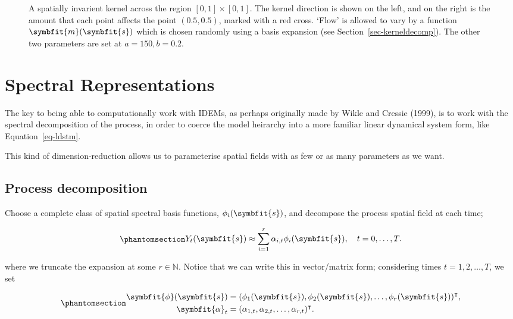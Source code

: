 \documentclass[
]{report}
\newcommand{\bv}[1]{\symbfit{#1}}
\theoremstyle{plain}
\theoremstyle{plain}
\theoremstyle{plain}
\theoremstyle{remark}
\begin{document}
\begin{figure}[h]
\begin{minipage}{0.50\linewidth}
\end{minipage}%

\caption{\label{fig-examplekernelvar}A spatially invarient kernel across
the region \([0,1]\times[0,1]\). The kernel direction is shown on the
left, and on the right is the amount that each point affects the point
\((0.5,0.5)\), marked with a red cross. `Flow' is allowed to vary by a
function \(\bv m(\bv s)\) which is chosen randomly using a basis
expansion (see Section~\ref{sec-kerneldecomp}). The other two parameters
are set at \(a=150,b=0.2\).}

\end{figure}%

\chapter{Spectral Representations}\label{spectral-representations}

The key to being able to computationally work with IDEMs, as perhaps
originally made by Wikle and Cressie (1999), is to work with the
spectral decomposition of the process, in order to coerce the model
heirarchy into a more familiar linear dynamical system form, like
Equation~\ref{eq-ldstm}.

This kind of dimension-reduction allows us to parameterise spatial
fields with as few or as many parameters as we want.

\section{Process decomposition}\label{process-decomposition}

Choose a complete class of spatial spectral basis functions,
\(\phi_i(\bv s)\), and decompose the process spatial field at each time;

\begin{equation}\phantomsection\label{eq-processdecomp}{\begin{split}
Y_t(\bv s) \approx \sum_{i=1}^{r} \alpha_{i,t} \phi_i(\bv s), \quad t=0,\dots,T.
\end{split}
}\end{equation}

where we truncate the expansion at some \(r\in\mathbb N\). Notice that
we can write this in vector/matrix form; considering times
\(t=1,2,\dots, T\), we set

\begin{equation}\phantomsection\label{eq-vecmats}{\begin{split}
\bv \phi(\bv s) &= (\phi_1(\bv s), \phi_2(\bv s), \dots, \phi_r(\bv s))^{\intercal},\\
\bv \alpha_t &= (\alpha_{1,t}, \alpha_{2,t}, \dots, \alpha_{r, t})^{\intercal}.
\end{split}
}\end{equation}
\end{document}
